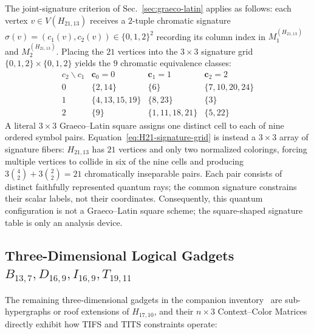 \documentclass[aps,pra,reprint,superscriptaddress,longbibliography,nofootinbib,floatfix,10pt]{revtex4-2}
\theoremstyle{definition}\newtheorem{definition}[theorem]{Definition}
\theoremstyle{remark}\newtheorem{remark}[theorem]{Remark}
\begin{document}
The joint-signature criterion of Sec.~\ref{sec:graeco-latin} applies as follows: each vertex $v\in V(H_{21,13})$ receives a $2$-tuple chromatic signature $\sigma(v)=(c_1(v),c_2(v))\in\{0,1,2\}^2$ recording its column index in $M_1^{(H_{21,13})}$ and $M_2^{(H_{21,13})}$. Placing the $21$ vertices into the $3\times 3$ signature grid $\{0,1,2\}\times\{0,1,2\}$ yields the $9$ chromatic equivalence classes:
\begin{equation}\label{eq:H21-signature-grid}
\begin{array}{c|ccc}
c_2\backslash c_1 & \mathbf{c}_0=0 & \mathbf{c}_1=1 & \mathbf{c}_2=2\\\hline
0 & \{2,14\} & \{6\} & \{7,10,20,24\}\\
1 & \{4,13,15,19\} & \{8,23\} & \{3\}\\
2 & \{9\} & \{1,11,18,21\} & \{5,22\}
\end{array}
\end{equation}
A literal $3\times3$ Graeco--Latin square assigns one distinct cell to each of nine ordered symbol pairs. Equation~\eqref{eq:H21-signature-grid} is instead a $3\times3$ array of signature fibers: $H_{21,13}$ has $21$ vertices and only two normalized colorings, forcing multiple vertices to collide in six of the nine cells and producing $3\binom{4}{2}+3\binom{2}{2}=21$ chromatically inseparable pairs. Each pair consists of distinct faithfully represented quantum rays; the common signature constrains their scalar labels, not their coordinates. Consequently, this quantum configuration is not a Graeco--Latin square scheme; the square-shaped signature table is only an analysis device.

\subsection{Three-Dimensional Logical Gadgets \texorpdfstring{$B_{13,7},D_{16,9},I_{16,9},T_{19,11}$}{B13,7, D16,9, I16,9, T19,11}}\label{sec:3d-gadgets}

The remaining three-dimensional gadgets in the companion inventory~\cite{svozil2026contexts} are sub-hypergraphs or roof extensions of $H_{17,10}$, and their $n\times 3$ Context--Color Matrices directly exhibit how TIFS and TITS constraints operate:
\end{document}
